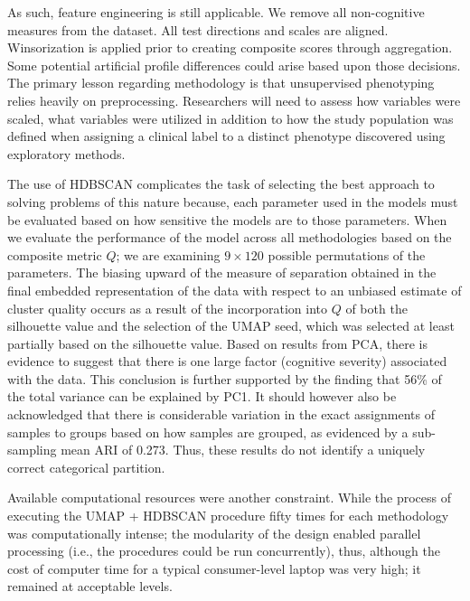 As such, feature engineering is still applicable. We remove all non-cognitive measures from the dataset. All test directions and scales are aligned. Winsorization is applied prior to creating composite scores through aggregation. Some potential artificial profile differences could arise based upon those decisions. The primary lesson regarding methodology is that unsupervised phenotyping relies heavily on preprocessing. Researchers will need to assess how variables were scaled, what variables were utilized in addition to how the study population was defined when assigning a clinical label to a distinct phenotype discovered using exploratory methods.

The use of HDBSCAN complicates the task of selecting the best approach to solving problems of this nature because, each parameter used in the models must be evaluated based on how sensitive the models are to those parameters. When we evaluate the performance of the model across all methodologies based on the composite metric \(Q\); we are examining \(9\times120\) possible permutations of the parameters. The biasing upward of the measure of separation obtained in the final embedded representation of the data with respect to an unbiased estimate of cluster quality occurs as a result of the incorporation into \(Q\) of both the silhouette value and the selection of the UMAP seed, which was selected at least partially based on the silhouette value. Based on results from PCA, there is evidence to suggest that there is one large factor (cognitive severity) associated with the data. This conclusion is further supported by the finding that 56\% of the total variance can be explained by PC1. It should however also be acknowledged that there is considerable variation in the exact assignments of samples to groups based on how samples are grouped, as evidenced by a sub-sampling mean ARI of 0.273. Thus, these results do not identify a uniquely correct categorical partition.

Available computational resources were another constraint. While the process of executing the UMAP + HDBSCAN procedure fifty times for each methodology was computationally intense; the modularity of the design enabled parallel processing (i.e., the procedures could be run concurrently), thus, although the cost of computer time for a typical consumer-level laptop was very high; it remained at acceptable levels.

